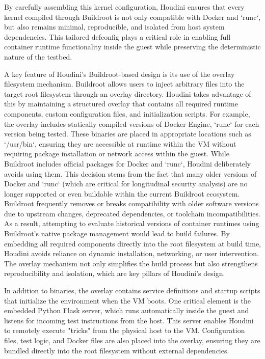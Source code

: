 \documentclass[12pt]{report}
\begin{document}
\begin{doublespace}
By carefully assembling this kernel configuration, Houdini ensures that every kernel compiled through Buildroot is not only compatible with Docker and `runc`, but also remains minimal, reproducible, and isolated from host system dependencies. This tailored defconfig plays a critical role in enabling full container runtime functionality inside the guest while preserving the deterministic nature of the testbed.

A key feature of Houdini's Buildroot-based design is its use of the overlay filesystem mechanism. Buildroot allows users to inject arbitrary files into the target root filesystem through an overlay directory. Houdini takes advantage of this by maintaining a structured overlay that contains all required runtime components, custom configuration files, and initialization scripts. For example, the overlay includes statically compiled versions of Docker Engine, `runc` for each version being tested. These binaries are placed in appropriate locations such as `/usr/bin`, ensuring they are accessible at runtime within the VM without requiring package installation or network access within the guest. While Buildroot includes official packages for Docker and `runc`, Houdini deliberately avoids using them. This decision stems from the fact that many older versions of Docker and `runc` (which are critical for longitudinal security analysis) are no longer supported or even buildable within the current Buildroot ecosystem. Buildroot frequently removes or breaks compatibility with older software versions due to upstream changes, deprecated dependencies, or toolchain incompatibilities. As a result, attempting to evaluate historical versions of container runtimes using Buildroot's native package management would lead to build failures. By embedding all required components directly into the root filesystem at build time, Houdini avoids reliance on dynamic installation, networking, or user intervention. The overlay mechanism not only simplifies the build process but also strengthens reproducibility and isolation, which are key pillars of Houdini's design.

In addition to binaries, the overlay contains service definitions and startup scripts that initialize the environment when the VM boots. One critical element is the embedded Python Flask server, which runs automatically inside the guest and listens for incoming test instructions from the host. This server enables Houdini to remotely execute "tricks" from the physical host to the VM. Configuration files, test logic, and Docker files are also placed into the overlay, ensuring they are bundled directly into the root filesystem without external dependencies.


\end{doublespace}
\end{document}
